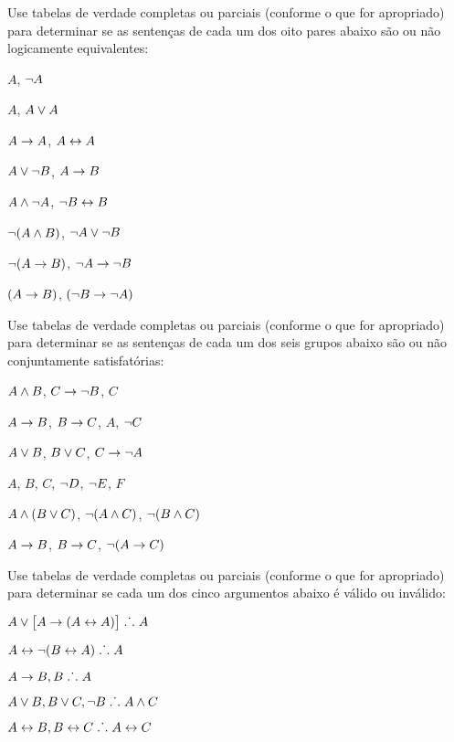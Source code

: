 \practiceproblems
\solutions

\solutions
\problempart
\label{pr.TT.equiv3}
Use tabelas de verdade completas ou parciais (conforme o que for apropriado) para determinar se as sentenças de cada um dos oito pares abaixo são ou não logicamente equivalentes:
\begin{earg}
\item $A$, $\neg A$ %
\item $A$, $A \vee A$ %
\item $A\rightarrow A$, $A \leftrightarrow A$ %
\item $A \vee \neg B$, $A\rightarrow B$ %
\item $A \wedge \neg A$, $\neg B \leftrightarrow B$ %
\item $\neg(A \wedge B)$, $\neg A \vee \neg B$ %
\item $\neg(A \rightarrow B)$, $\neg A \rightarrow \neg B$ %
\item $(A \rightarrow B)$, $(\neg B \rightarrow \neg A)$ %
\end{earg}

\solutions
\problempart
\label{pr.TT.satisfiable4}
Use tabelas de verdade completas ou parciais (conforme o que for apropriado) para determinar se as sentenças de cada um dos seis grupos abaixo são ou não conjuntamente satisfatórias:
\begin{earg}
\item $A \wedge B$, $C\rightarrow \neg B$, $C$ %
\item $A\rightarrow B$, $B\rightarrow C$, $A$, $\neg C$ %
\item $A \vee B$, $B\vee C$, $C\rightarrow \neg A$ %
\item $A$, $B$, $C$, $\neg D$, $\neg E$, $F$ %
\item $A \wedge (B \vee C)$, $\neg(A \wedge C)$, $\neg(B \wedge C)$ %
\item $A \rightarrow B$, $B \rightarrow C$, $\neg(A \rightarrow C)$ %
\end{earg}

\solutions
\problempart
\label{pr.TT.valid4}
Use tabelas de verdade completas ou parciais (conforme o que for apropriado) para determinar se cada um dos cinco argumentos abaixo é válido ou inválido:
\begin{earg}
\item $A\vee\bigl[A\rightarrow(A\leftrightarrow A)\bigr] \mathrel{\ldotp\dot{}\,\ldotp} A$ %
\item $A\leftrightarrow\neg(B\leftrightarrow A) \mathrel{\ldotp\dot{}\,\ldotp} A$ %
\item $A\rightarrow B, B \mathrel{\ldotp\dot{}\,\ldotp} A$ %
\item $A\vee B, B\vee C, \neg B \mathrel{\ldotp\dot{}\,\ldotp} A \wedge C$ %
\item $A\leftrightarrow B, B\leftrightarrow C \mathrel{\ldotp\dot{}\,\ldotp} A\leftrightarrow C$ %
\end{earg}

